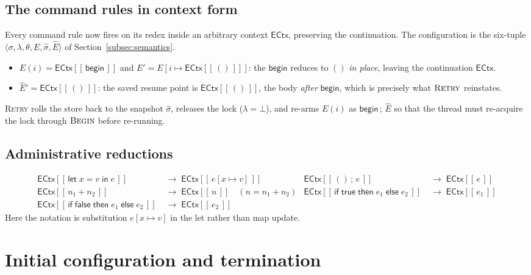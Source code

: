 \documentclass[manuscript,nonacm]{acmart}
\theoremstyle{acmdefinition}
\newcommand{\reduces}{\longrightarrow}
\newcommand{\unit}{()}
\newcommand{\bbegin}{\textsf{begin}}
\newcommand{\subst}[3]{#1[#2\mapsto #3]}
\newcommand{\ectx}{\mathsf{ECtx}}
\newcommand{\ehole}[1]{\ectx[[\, #1 \,]]}
\begin{document}
\subsection{The command rules in context form}

Every command rule now fires on its redex inside an arbitrary context $\ectx$,
preserving the continuation. The configuration is the six-tuple
$\langle\sigma,\lambda,\theta,E,\hat{\sigma},\hat{E}\rangle$ of
Section~\ref{subsec:semantics}.

\begin{itemize}
\item $E(i)=\ehole{\bbegin}$ and $E'=E[i\mapsto \ehole{\unit}]$: the $\bbegin$ reduces to
$\unit$ \emph{in place}, leaving the continuation $\ectx$.
\item $\hat{E}'=\ehole{\unit}$: the saved resume point is $\ehole{\unit}$,
the body \emph{after} $\bbegin$, which is precisely what $\textsc{Retry}$
reinstates.
\end{itemize}
\textsc{Retry} rolls the store back to
the snapshot $\hat{\sigma}$, releases the lock ($\lambda = \bot$), and
re-arms $E(i)$ as $\bbegin\,;\,\hat{E}$ so that the thread must re-acquire the
lock through $\textsc{Begin}$ before re-running.

\subsection{Administrative reductions}
\label{subsec:admin}

\[
\begin{aligned}
\ehole{\textsf{let}\;x = v\;\textsf{in}\;e} &\;\reduces\; \ehole{\subst{e}{x}{v}} &
\ehole{\unit \,;\, e} &\;\reduces\; \ehole{e} \\
\ehole{n_1 + n_2} &\;\reduces\; \ehole{n} \quad (n = n_1 + n_2) &
\ehole{\textsf{if}\;\textsf{true}\;\textsf{then}\;e_1\;\textsf{else}\;e_2}
                      &\;\reduces\; \ehole{e_1} \\
  \ehole{\textsf{if}\;\textsf{false}\;\textsf{then}\;e_1\;\textsf{else}\;e_2}
  & \;\reduces\; \ehole{e_{2}}
\end{aligned}
\]
Here the notation is substitution $\subst{e}{x}{v}$ in the \textsf{let}
rather than map update.




\section{Initial configuration and termination}
\label{sec:init-final}
\end{document}

